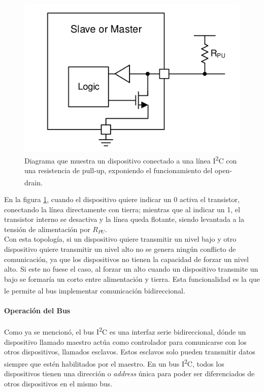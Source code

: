 \begin{figure}[h]
    \centering
    \includegraphics[scale=0.3]{Imagenes/Diagrama Open-Drain.png}
    \caption{Diagrama que muestra un dispositivo conectado a una línea I\textsuperscript{2}C con una resistencia de pull-up, exponiendo el funcionamiento del open-drain.\textsuperscript{\cite{I2C}}}
    \label{opendrain_i2c}
\end{figure}

En la figura \ref{opendrain_i2c}, cuando el dispositivo quiere indicar un 0 activa el transistor, conectando la línea directamente con tierra; mientras que al indicar un 1, el transistor interno se desactiva y la línea queda flotante, siendo levantada a la tensión de alimentación por $R_{PU}$.\\

Con esta topología, si un dispositivo quiere transmitir un nivel bajo y otro dispositivo quiere transmitir un nivel alto no se genera ningún conflicto de comunicación, ya que los dispositivos no tienen la capacidad de forzar un nivel alto. Si este no fuese el caso, al forzar un alto cuando un dispositivo transmite un bajo se formaría un corto entre alimentación y tierra. Esta funcionalidad es la que le permite al bus implementar comunicación bidireccional.\textsuperscript{\cite{I2C}}\\

\paragraph{Operación del Bus}

Como ya se mencionó, el bus I\textsuperscript{2}C es una interfaz serie bidireccional, dónde un dispositivo llamado maestro actúa como controlador para comunicarse con los otros dispositivos, llamados esclavos. Estos esclavos solo pueden transmitir datos siempre que estén habilitados por el maestro. En un bus I\textsuperscript{2}C, todos los dispositivos tienen una dirección o \textit{address} única para poder ser diferenciados de otros dispositivos en el mismo bus.\\

